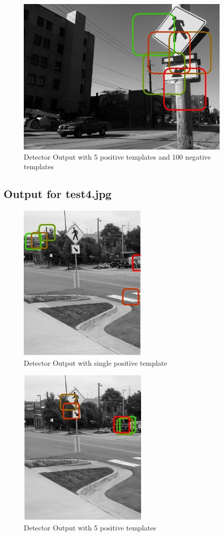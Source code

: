 \documentclass[11pt,psfig]{article}
\begin{document}
\begin{figure}[H]
\centering
\includegraphics[height=3in]{prob5_a3plot1.jpg}
\caption{Detector Output with 5 positive templates and 100 negative templates}
\end{figure}

\subsection*{Output for test4.jpg}

\begin{figure}[H]
\centering
\includegraphics[height=3in]{prob5_a1plot2.jpg}
\caption{Detector Output with single positive template}
\end{figure}

\begin{figure}[H]
\centering
\includegraphics[height=3in]{prob5_a2plot2.jpg}
\caption{Detector Output with 5 positive templates}
\end{figure}
\end{document}
